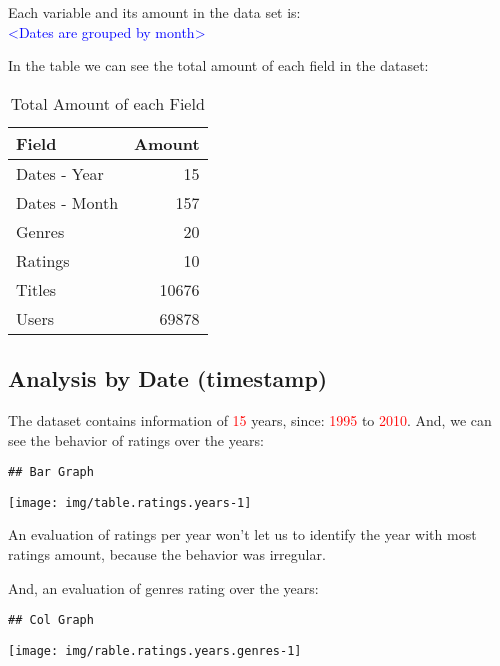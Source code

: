 \documentclass[]{article}
\begin{document}
Each variable and its amount in the data set is:\\
\textcolor{blue}{<Dates are grouped by month>}

In the table we can see the total amount of each field in the dataset:

\begin{table}[!h]

\caption{\label{tab:movies.users.genres.list}Total Amount of each Field}
\centering
\begin{tabular}{lr}
\toprule
Field & Amount\\
\midrule
\rowcolor{gray!6}  Dates - Year & 15\\
Dates - Month & 157\\
\rowcolor{gray!6}  Genres & 20\\
Ratings & 10\\
\rowcolor{gray!6}  Titles & 10676\\
\addlinespace
Users & 69878\\
\bottomrule
\end{tabular}
\end{table}

\hypertarget{analysis-by-date-timestamp}{%
\subsection{Analysis by Date
(timestamp)}\label{analysis-by-date-timestamp}}

The dataset contains information of \textcolor{red}{15} years, since:
\textcolor{red}{1995} to \textcolor{red}{2010}. And, we can see the
behavior of ratings over the years:

\begin{verbatim}
## Bar Graph
\end{verbatim}

\begin{center}\texttt{[image: img/table.ratings.years-1]} \end{center}

An evaluation of ratings per year won't let us to identify the year with
most ratings amount, because the behavior was irregular.

And, an evaluation of genres rating over the years:

\begin{verbatim}
## Col Graph
\end{verbatim}

\begin{center}\texttt{[image: img/rable.ratings.years.genres-1]} \end{center}
\end{document}
